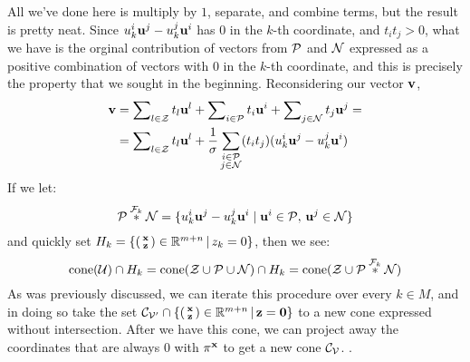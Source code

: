 All we've done here is multiply by $1$, separate, and combine terms, but the result is pretty neat.  Since $u^i_k\u^j - u^j_k\u^i$ has $0$ in the $k$-th coordinate, and $t_i t_j > 0$, what we have is the orginal contribution of vectors from $\P$ and $\N$ expressed as a positive combination of vectors with $0$ in the $k$-th coordinate, and this is precisely the property that we sought in the beginning.  Reconsidering our vector $\v$,
  \begin{align*} \v &= \setsum{t}{l}{\Z} + \setsum{t}{i}{\P} + \setsum{t}{j}{\N} = \\
                    &= \setsum{t}{l}{\Z} + 
      \frac{1}{\sigma}\sum_{\substack{i\in\P\\j\in\N}} (t_i t_j) (u^i_k\u^j - u^j_k\u^i)
  \end{align*}
If we let:
  \[\P \fjoink \N = \{u^i_k\u^j - u^j_k\u^i \;|\; \u^i \in \P,\, \u^j \in \N \}\]
and quickly set $H_k = \smallsetzeq{z_k}{0}$, then we see:
  \[ \cone(\U) \cap H_k = \cone(\Z \cup \P \cup \N) \cap H_k = 
                          \cone(\Z \cup \P \fjoink \N)
  \]
As was previously discussed, we can iterate this procedure over every $k \in M$, and in doing so take the set $\CVp \cap \smallsetzeq{\z}{\vec{0}}$ to a new cone expressed without intersection.  After we have this cone, we can project away the coordinates that are always $0$ with $\pi^{\x}$ to get a new cone $\CV$.  .

